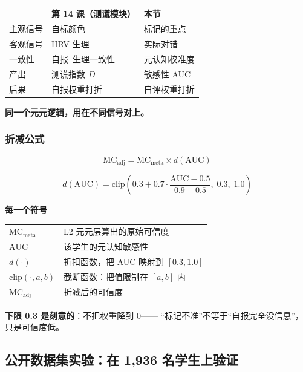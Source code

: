 \documentclass[UTF8,a4paper,11pt]{ctexart}
\newenvironment{explainbox}[1]
{\begin{center}\begin{minipage}{0.94\textwidth}\colorbox{boxbg}{\parbox{0.92\textwidth}{\textbf{#1}\par\vspace{2pt}}}}
{\end{minipage}\end{center}}
\begin{document}
\begin{center}
\begin{tabular}{p{3.0cm}p{5.2cm}p{5.6cm}}
\toprule
 & \textbf{第 14 课（测谎模块）} & \textbf{本节} \\
\midrule
主观信号 & 自标颜色 & 标记的重点 \\
客观信号 & HRV 生理 & 实际对错 \\
一致性 & 自报--生理一致性 & 元认知校准度 \\
产出 & 测谎指数 $D$ & 敏感性 AUC \\
后果 & 自报权重打折 & 自评权重打折 \\
\bottomrule
\end{tabular}
\end{center}

\textbf{同一个元元逻辑，用在不同信号对上。}

\subsubsection{折减公式}

\begin{equation}
\text{MC}_{\text{adj}} = \text{MC}_{\text{meta}} \times d(\text{AUC})
\end{equation}

\begin{equation}
d(\text{AUC}) = \text{clip}\left(0.3 + 0.7 \cdot \frac{\text{AUC} - 0.5}{0.9 - 0.5},\; 0.3,\; 1.0\right)
\end{equation}

\begin{explainbox}{每一个符号}
\begin{longtable}{@{}p{3.4cm}p{10.4cm}@{}}
$\text{MC}_{\text{meta}}$ & L2 元元层算出的原始可信度 \\
$\text{AUC}$ & 该学生的元认知敏感性 \\
$d(\cdot)$ & 折扣函数，把 AUC 映射到 $[0.3, 1.0]$ \\
$\text{clip}(\cdot, a, b)$ & 截断函数：把值限制在 $[a,b]$ 内 \\
$\text{MC}_{\text{adj}}$ & 折减后的可信度 \\
\end{longtable}
\textbf{下限 0.3 是刻意的}：不把权重降到 0——
“标记不准”不等于“自报完全没信息”，只是可信度低。
\end{explainbox}

\subsection{公开数据集实验：在 1{,}936 名学生上验证}
\end{document}

